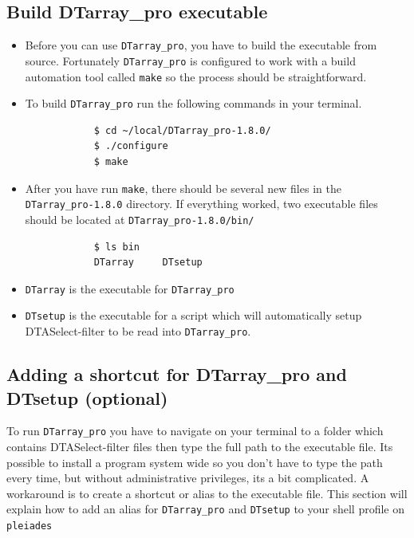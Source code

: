 \documentclass[12pt]{article}
\newcommand{\VERSION}{1.8.0}
\begin{document}
	\subsection{Build DTarray\_pro executable}
	\begin{itemize}
		\item Before you can use \texttt{DTarray\_pro}, you have to build the executable from source. Fortunately \texttt{DTarray\_pro} is configured to work with a build automation tool called \texttt{make} so the process should be straightforward.
		
		\item To build \texttt{DTarray\_pro} run the following commands in your terminal.
		
		\begin{lstlisting}
			$ cd ~/local/DTarray_pro-1.8.0/
			$ ./configure
			$ make
		\end{lstlisting}
		
		\item After you have run \texttt{make}, there should be several new files in the \texttt{DTarray\_pro-\VERSION} directory.  If everything worked, two executable files should be located at \texttt{DTarray\_pro-\VERSION/bin/}
		
		\begin{lstlisting}
			$ ls bin
			DTarray		DTsetup
		\end{lstlisting}
		
		\item \texttt{DTarray} is the executable for \texttt{DTarray\_pro}
		
		\item \texttt{DTsetup} is the executable for a script which will automatically setup DTASelect-filter to be read into \texttt{DTarray\_pro}.
		
	\end{itemize}

	\subsection{Adding a shortcut for DTarray\_pro and DTsetup (optional)}
	
	To run \texttt{DTarray\_pro} you have to navigate on your terminal to a folder which contains DTASelect-filter files then type the full path to the executable file.  Its possible to install a program system wide so you don't have to type the path every time, but without administrative privileges, its a bit complicated. A workaround is to create a shortcut or alias to the executable file.  This section will explain how to add an alias for \texttt{DTarray\_pro} and \texttt{DTsetup} to your shell profile on \texttt{pleiades}
	
\end{document}
